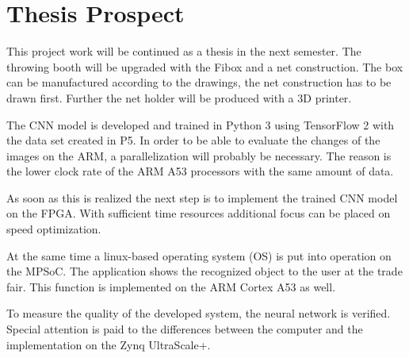\section{Thesis Prospect}
\label{sec:thesis_prospect}

This project work will be continued as a thesis in the next semester.
The throwing booth will be upgraded with the Fibox and a net construction.
The box can be manufactured according to the drawings, the net construction has to be drawn first.
Further the net holder will be produced with a 3D printer.

The CNN model is developed and trained in Python 3 using TensorFlow 2 with the data set created in P5.
In order to be able to evaluate the changes of the images on the ARM, a parallelization will probably be necessary.
The reason is the lower clock rate of the ARM A53 processors with the same amount of data.

As soon as this is realized the next step is to implement the trained CNN model on the FPGA.
With sufficient time resources additional focus can be placed on speed optimization.

At the same time a linux-based operating system (OS) is put into operation on the MPSoC.
The application shows the recognized object to the user at the trade fair.
This function is implemented on the ARM Cortex A53 as well.

To measure the quality of the developed system, the neural network is verified.
Special attention is paid to the differences between the computer and the implementation on the Zynq UltraScale+.
